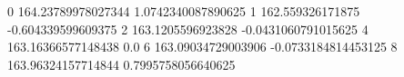 0 164.23789978027344 1.0742340087890625
1 162.559326171875 -0.604339599609375
2 163.1205596923828 -0.0431060791015625
4 163.16366577148438 0.0
6 163.09034729003906 -0.0733184814453125
8 163.96324157714844 0.7995758056640625
